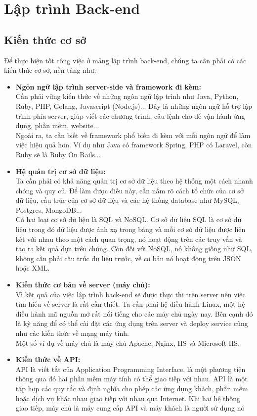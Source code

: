\section{Lập trình Back-end}
\subsection{Kiến thức cơ sở}
\noindent Để thực hiện tốt công việc ở mảng lập trình back-end, chúng ta cần phải có các kiến thức cơ sở, nền
tảng như:
\begin{itemize}
  \item \textbf{Ngôn ngữ lập trình server-side và framework đi kèm:} \\[0.2cm]
  Cần phải vững kiến thức về những ngôn ngữ lập trình như Java, Python, Ruby, PHP, Golang,
  Javascript (Node.js)... Đây là những ngôn ngữ hỗ trợ lập trình phía server, giúp viết các chương
  trình, câu lệnh cho để vận hành ứng dụng, phần mềm, website...\\[0.5cm]
  Ngoài ra, ta cần biết về framework phổ biến đi kèm với mỗi ngôn ngữ để làm việc hiệu quả hơn. Ví
dụ như Java có framework Spring, PHP có Laravel, còn Ruby sẽ là Ruby On Rails...
  \item \textbf{Hệ quản trị cơ sở dữ liệu:}\\[0.2cm]
  Ta cần phải có khả năng quản trị cơ sở dữ liệu theo hệ thống một cách nhanh chóng và quy củ. Để
  làm được điều này, cần nắm rõ cách tổ chức của cơ sở dữ liệu, cấu trúc của cơ sở dữ liệu và các hệ
  thống database như MySQL, Postgres, MongoDB...\\[0.5cm]
  Có hai loại cơ sở dữ liệu là SQL và NoSQL. Cơ sở dữ liệu SQL là cơ sở dữ liệu trong đó dữ liệu
được ánh xạ trong bảng và mỗi cơ sở dữ liệu được liên kết với nhau theo một cách quan trọng, nó
hoạt động trên các truy vấn và tạo ra kết quả dựa trên chúng. Còn đối với NoSQL, nó không giống
như SQL, không cần phải cấu trúc dữ liệu trước, về cơ bản nó hoạt động trên JSON hoặc XML.
  \item \textbf{Kiến thức cơ bản về server (máy chủ):}\\[0.2cm]
  Vì kết quả của việc lập trình back-end sẽ được thực thi trên server nên việc tìm hiểu về server là
  rất cần thiết. Ta cần phải hệ điều hành Linux, một hệ điều hành mã nguồn mở rất nổi tiếng cho
  các máy chủ ngày nay. Bên cạnh đó là kỹ năng để có thể cài đặt các ứng dụng trên server và deploy
  service cũng như các kiến thức về mạng máy tính.\\[0.5cm]
  Một số ví dụ về máy chủ là máy chủ Apache, Nginx, IIS và Microsoft IIS.
  \item \textbf{Kiến thức về API:}\\[0.2cm]
  API là viết tắt của Application Programming Interface, là một phương tiện thông qua đó hai phần
  mềm máy tính có thể giao tiếp với nhau. API là một tập hợp các quy tắc và định nghĩa cho phép
  các ứng dụng khách, phần mềm hoặc dịch vụ khác nhau giao tiếp với nhau qua Internet. Khi hai
  hệ thống giao tiếp, máy chủ là máy cung cấp API và máy khách là người sử dụng nó
\end{itemize}
